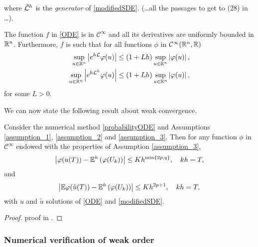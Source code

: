 where $\tilde {\mathcal{L}}^h$ is the \textit{generator} of \eqref{modifiedSDE}. (\ldots all the passages to get to (28) in \cite{CGS16} \ldots).
\begin{assumption} \label{assumption_3}The function $f$ in \eqref{ODE} is in $\mathcal C^\infty$ and all its derivatives are uniformly bounded in $\mathbb{R}^n$. Furthermore, $f$ is such that for all functions $\phi$ in $\mathcal C ^\infty(\mathbb{R}^n, \mathbb{R})$ 
\begin{equation}
\begin{aligned}
	\sup_{u\in\mathbb{R}^n} \left| e^{h\mathcal{L}} \varphi(u) \right| &\leq (1 + Lh) \sup_{u\in\mathbb{R}^n} \left|\varphi(u)\right|, \\
	\sup_{u\in\mathbb{R}^n} \left| e^{h\mathcal{L}^h} \varphi(u) \right| &\leq (1 + Lh) \sup_{u\in\mathbb{R}^n} \left|\varphi(u)\right|, \\
\end{aligned}
\end{equation}
for some $L > 0$.
\end{assumption}
\noindent We can now state the following result about weak convergence.
\begin{theorem}\label{thm:weakorder} Consider the numerical method \eqref{probabilityODE} and Assumptions \ref{assumption_1}, \ref{assumption_2} and \ref{assumption_3}. Then for any function $\phi$ in $\mathcal{C}^\infty$ endowed with the properties of Assumption \ref{assumption_3},
\begin{equation}
	\left|\varphi(u(T)) - \mathbb{E}^h\left(\varphi(U_k)\right)\right| \leq Kh^{\min\{2p, q\}}, \quad kh = T,
\end{equation}
and 
\begin{equation}
\left|\mathbb{E}\varphi(\tilde u(T)) - \mathbb{E}^h\left(\varphi(U_k)\right)\right| \leq Kh^{2p + 1}, \quad kh = T,
\end{equation}
with $u$ and $\tilde u$ solutions of \eqref{ODE} and \eqref{modifiedSDE}.
\end{theorem}
\begin{proof} proof in \cite{CGS16}.
\end{proof}

\subsubsection{Numerical verification of weak order}

